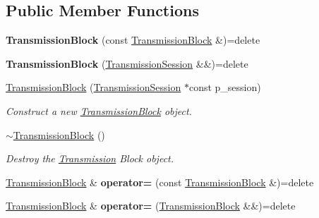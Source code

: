 \subsection*{Public Member Functions}
\begin{DoxyCompactItemize}
\item 
{\bfseries Transmission\+Block} (const \hyperlink{class_network_coding_1_1_transmission_block}{Transmission\+Block} \&)=delete\hypertarget{class_network_coding_1_1_transmission_block_a627842c53e1c3b0be511b98e85da7b02}{}\label{class_network_coding_1_1_transmission_block_a627842c53e1c3b0be511b98e85da7b02}

\item 
{\bfseries Transmission\+Block} (\hyperlink{class_network_coding_1_1_transmission_session}{Transmission\+Session} \&\&)=delete\hypertarget{class_network_coding_1_1_transmission_block_a4863f50573d5d6f2aab3c05b8f8fa6e8}{}\label{class_network_coding_1_1_transmission_block_a4863f50573d5d6f2aab3c05b8f8fa6e8}

\item 
\hyperlink{class_network_coding_1_1_transmission_block_a77977a7fed4dbf38c23a31bacc5f5e96}{Transmission\+Block} (\hyperlink{class_network_coding_1_1_transmission_session}{Transmission\+Session} $\ast$const p\+\_\+session)
\begin{DoxyCompactList}\small\item\em Construct a new \hyperlink{class_network_coding_1_1_transmission_block}{Transmission\+Block} object. \end{DoxyCompactList}\item 
\hyperlink{class_network_coding_1_1_transmission_block_a7a001dfa2611c27d3cedbcdcd292c927}{$\sim$\+Transmission\+Block} ()
\begin{DoxyCompactList}\small\item\em Destroy the \hyperlink{class_network_coding_1_1_transmission}{Transmission} Block object. \end{DoxyCompactList}\item 
\hyperlink{class_network_coding_1_1_transmission_block}{Transmission\+Block} \& {\bfseries operator=} (const \hyperlink{class_network_coding_1_1_transmission_block}{Transmission\+Block} \&)=delete\hypertarget{class_network_coding_1_1_transmission_block_adece22af088c127c18822d42d0f0e053}{}\label{class_network_coding_1_1_transmission_block_adece22af088c127c18822d42d0f0e053}

\item 
\hyperlink{class_network_coding_1_1_transmission_block}{Transmission\+Block} \& {\bfseries operator=} (\hyperlink{class_network_coding_1_1_transmission_block}{Transmission\+Block} \&\&)=delete\hypertarget{class_network_coding_1_1_transmission_block_af0cc440e659421ce4d0c4b90a293a8fd}{}\label{class_network_coding_1_1_transmission_block_af0cc440e659421ce4d0c4b90a293a8fd}


\end{DoxyCompactItemize}
